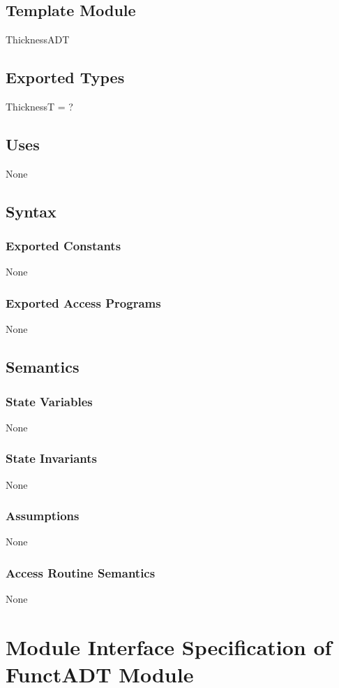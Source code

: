 \documentclass[12pt]{article}
\begin{document}
\subsection{Template Module}
\label{Sec:TemplateModule}
ThicknessADT
\subsection{Exported Types}
\label{Sec:ExpTypes}
ThicknessT = ?
\subsection{Uses}
\label{Sec:Uses}
None
\subsection{Syntax}
\label{Sec:Syntax}
\subsubsection{Exported Constants}
\label{Sec:ExpConstants}
None
\subsubsection{Exported Access Programs}
\label{Sec:ExpAccPrograms}
None
\subsection{Semantics}
\label{Sec:Semantics}
\subsubsection{State Variables}
\label{Sec:StateVars}
None
\subsubsection{State Invariants}
\label{Sec:StateInvars}
None
\subsubsection{Assumptions}
\label{Sec:Assumps}
None
\subsubsection{Access Routine Semantics}
\label{Sec:AccRoutSemantics}
None
\section{Module Interface Specification of FunctADT Module}
\label{Sec:FunctADT}
\end{document}
